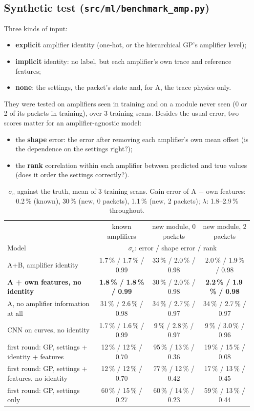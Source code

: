 \documentclass[10pt]{article}
\newcommand{\code}[1]{\texttt{#1}}
\begin{document}
\subsection{Synthetic test (\code{src/ml/benchmark\_amp.py})}
Three kinds of input:
\begin{itemize}
\item \textbf{explicit} amplifier identity (one-hot, or the hierarchical GP's amplifier level);
\item \textbf{implicit} identity: no label, but each amplifier's own trace and reference features;
\item \textbf{none}: the settings, the packet's state and, for A, the trace physics only.
\end{itemize}
They were tested on amplifiers seen in training and on a module never seen (0 or 2 of its packets in training), over 3 training scans.
Besides the usual error, two scores matter for an amplifier-agnostic model:
\begin{itemize}
\item the \textbf{shape} error: the error after removing each amplifier's own mean offset (is the dependence on the settings right?);
\item the \textbf{rank} correlation within each amplifier between predicted and true values (does it order the settings correctly?).
\end{itemize}

\begin{table}[h]
\centering\footnotesize\setlength{\tabcolsep}{4pt}
\begin{tabular}{lccc}
\toprule
& known amplifiers & new module, 0 packets & new module, 2 packets \\
Model & \multicolumn{3}{c}{$\sigma_e$: error / shape error / rank} \\
\midrule
A+B, amplifier identity & 1.7\,\% / 1.7\,\% / 0.99 & 33\,\% / 2.0\,\% / 0.98 & 2.0\,\% / 1.9\,\% / 0.98 \\
\textbf{A + own features, no identity} & \textbf{1.8\,\% / 1.8\,\% / 0.99} & 30\,\% / 2.0\,\% / 0.98 & \textbf{2.2\,\% / 1.9\,\% / 0.98} \\
A, no amplifier information at all & 31\,\% / 2.6\,\% / 0.98 & 34\,\% / 2.7\,\% / 0.97 & 34\,\% / 2.7\,\% / 0.97 \\
CNN on curves, no identity & 1.7\,\% / 1.6\,\% / 0.99 & 9\,\% / 2.8\,\% / 0.97 & 9\,\% / 3.0\,\% / 0.96 \\
first round: GP, settings + identity + features & 12\,\% / 12\,\% / 0.70 & 95\,\% / 13\,\% / 0.36 & 19\,\% / 15\,\% / 0.08 \\
first round: GP, settings + features, no identity & 12\,\% / 12\,\% / 0.70 & 77\,\% / 12\,\% / 0.42 & 17\,\% / 13\,\% / 0.45 \\
first round: GP, settings only & 60\,\% / 15\,\% / 0.27 & 60\,\% / 14\,\% / 0.23 & 59\,\% / 13\,\% / 0.44 \\
\bottomrule
\end{tabular}
\caption{$\sigma_e$ against the truth, mean of 3 training scans. Gain error of A + own features: 0.2\,\% (known), 30\,\% (new, 0
packets), 1.1\,\% (new, 2 packets); $\lambda$: 1.8--2.9\,\% throughout.}
\label{tab:amplabels}
\end{table}
\end{document}
